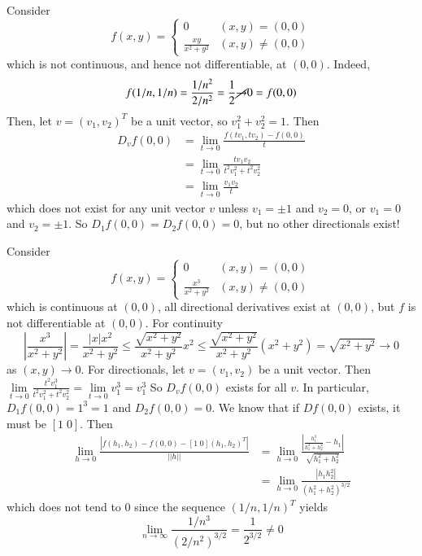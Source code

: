 \begin{example}
    Consider $$f(x,y) = \left\{\begin{array}{cc} 0 & (x,y) = (0,0) \\ \frac{xy}{x^2+y^2} & (x,y) \neq (0,0)\end{array}\right.$$ which is not continuous, and hence not differentiable, at $(0,0)$. Indeed, $$f(1/n,1/n) = \frac{1/n^2}{2/n^2} = \frac{1}{2}\cancel{\rightarrow}0 = f(0,0)$$ Then, let $v = (v_1,v_2)^T$ be a unit vector, so $v_1^2+v_2^2 = 1$. Then \begin{align*}
        D_vf(0,0) &= \lim\limits_{t\rightarrow 0}\frac{f(tv_1,tv_2)-f(0,0)}{t} \\
        &= \lim\limits_{t\rightarrow 0}\frac{tv_1v_2}{t^2v_1^2+t^2v_2^2} \\
        &= \lim\limits_{t\rightarrow 0}\frac{v_1v_2}{t}
    \end{align*}
    which does not exist for any unit vector $v$ unless $v_1 = \pm 1$ and $v_2 = 0$, or $v_1 = 0$ and $v_2 = \pm 1$. So $D_1f(0,0) = D_2f(0,0) = 0$, but no other directionals exist!
\end{example}

\begin{example}
    Consider $$f(x,y) = \left\{\begin{array}{cc} 0 & (x,y) = (0,0) \\ \frac{x^3}{x^2+y^2} & (x,y) \neq (0,0) \end{array}\right.$$ which is continuous at $(0,0)$, all directional derivatives exist at $(0,0)$, but $f$ is not differentiable at $(0,0)$. For continuity $$\left|\frac{x^3}{x^2+y^2}\right| = \frac{|x|x^2}{x^2+y^2} \leq \frac{\sqrt{x^2+y^2}}{x^2+y^2}x^2 \leq \frac{\sqrt{x^2+y^2}}{x^2+y^2}(x^2+y^2) = \sqrt{x^2+y^2}\rightarrow 0$$ as $(x,y) \rightarrow 0$. For directionals, let $v = (v_1,v_2)$ be a unit vector. Then $\lim\limits_{t\rightarrow 0}\frac{t^2v_1^3}{t^2v_1^2+t^2v_2^2} = \lim\limits_{t\rightarrow 0}v_1^3 = v_1^3$ So $D_vf(0,0)$ exists for all $v$. In particular, $D_1f(0,0) = 1^3 = 1$ and $D_2f(0,0) = 0$. We know that if $Df(0,0)$ exists, it must be $[1\;0]$. Then \begin{align*}
        \lim\limits_{h\rightarrow 0}\frac{|f(h_1,h_2) - f(0,0) - [1\;0](h_1,h_2)^T|}{||h||} &= \lim\limits_{h\rightarrow 0}\frac{\left|\frac{h_1^3}{h_1^2+h_2^2} - h_1\right|}{\sqrt{h_1^2+h_2^2}} \\
        &= \lim\limits_{h\rightarrow 0}\frac{|h_1h_2^2|}{(h_1^2+h_2^2)^{3/2}}
    \end{align*}
    which does not tend to $0$ since the sequence $(1/n,1/n)^T$ yields $$\lim\limits_{n\rightarrow \infty}\frac{1/n^3}{(2/n^2)^{3/2}} = \frac{1}{2^{3/2}} \neq 0$$
\end{example}



